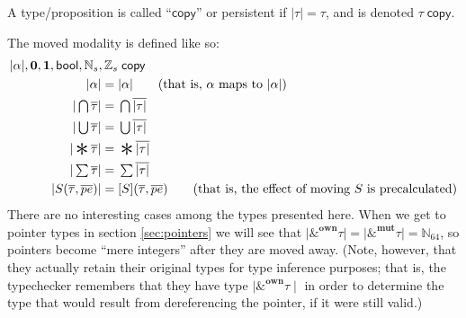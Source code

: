 \documentclass[acmsmall,nonacm]{acmart}
\DeclareMathOperator*{\Sep}{\scalerel*{\ast}{\sum}}
\newcommand*{\N}{\mathbb{N}}
\newcommand*{\Z}{\mathbb{Z}}
\newcommand{\core}[1]{{\mid}#1{\mid}}
\begin{document}
A type/proposition is called ``$\mathsf{copy}$'' or persistent if $\core\tau=\tau$, and is denoted $\tau\;\mathsf{copy}$.

The moved modality is defined like so:
\begin{align*}
  \core\alpha,\mathbf{0}, \mathbf{1}, \mathsf{bool},\N_s, \Z_s&\;\mathsf{copy}\\
  \core\alpha={}&\core\alpha\qquad\mbox{(that is, $\alpha$ maps to $\core\alpha$)}\\
  \core{\textstyle\bigcap\overline{\tau}}={}&\textstyle\bigcap\overline{\core\tau}\\
  \core{\textstyle\bigcup\overline{\tau}}={}&\textstyle\bigcup\overline{\core\tau}\\
  \core{\textstyle\Sep\overline{\tau}}={}&\textstyle\Sep\overline{\core\tau}\\
  \core{\textstyle\sum\overline{\tau}}={}&\textstyle\sum\overline{\core\tau}\\
  \core{S(\overline{\tau},\overline{pe})}={}&[S](\overline{\tau},\overline{pe})\qquad\mbox{(that is, the effect of moving $S$ is precalculated)}
\end{align*}
There are no interesting cases among the types presented here. When we get to pointer types in section \ref{sec:pointers} we will see that $\core{\&^\mathbf{own}\tau}=\core{\&^\mathbf{mut}\tau}=\N_{64}$, so pointers become ``mere integers'' after they are moved away. (Note, however, that they actually retain their original types for type inference purposes; that is, the typechecker remembers that they have type $\core{\&^\mathbf{own}\tau}$ in order to determine the type that would result from dereferencing the pointer, if it were still valid.)
\end{document}

